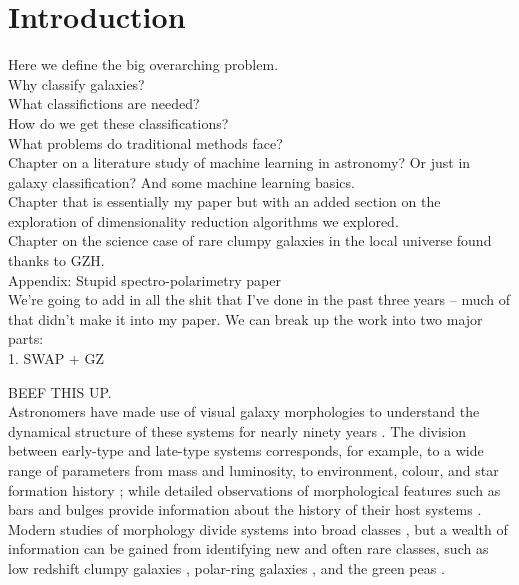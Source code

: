 
\chapter{Introduction}
\label{chap:intro}

Here we define the big overarching problem. \\
Why classify galaxies? \\
What classifictions are needed?\\
How do we get these classifications?\\
What problems do traditional methods face?\\

Chapter on a literature study of machine learning in astronomy? Or just in galaxy classification? And some machine learning basics. \\
Chapter that is essentially my paper but with an added section on the exploration of dimensionality reduction algorithms we explored. \\
Chapter on the science case of rare clumpy galaxies in the local universe found thanks to GZH.\\
Appendix: Stupid spectro-polarimetry paper\\


We're going to add in all the shit that I've done in the past three years -- much of that didn't make it into my paper. 
We can break up the work into two major parts: \\
1. SWAP + GZ 


BEEF THIS UP.\\
Astronomers have made use of visual galaxy morphologies to understand the dynamical structure of these systems for nearly ninety years 
\citep[e.g.,][]{Hubble1936, 
			deVauc1959, 
			Sandage1961, 
			vandenBergh1976, 
			NairAbraham2010, 
			Baillard2011}. 
The division between early-type and late-type systems corresponds, for example, to a wide range of parameters from mass and luminosity, to environment, colour, and star formation history 
\citep[e.g.,][]{Kormendy1977,  
			Dressler1980, 
			Strateva2001, 
			Blanton2003, 
			Kauffman2003, 
			Nakamura2003, 
			Shen2003, 
			Peng2010}; 
while detailed observations of morphological features such as bars and bulges 
provide information about the history of their host systems 
\citep[e.g., review by][]{KK04, 
			Elmegreen2008, 
			Sheth2008, 
			Masters2010, 
			Simmons2014}. 
Modern studies of morphology  divide systems into broad classes 
\citep[e.g.,][]{Conselice2006, 
			Lintott2008, 
			Kartaltepe2015, 
			Peth2016}, 
but a wealth of information can be gained from identifying new and often rare classes, 
such as low redshift clumpy galaxies \citep[e.g.,][]{Elmegreen2013}, polar-ring galaxies \citep[e.g.,][]{Whitmore1990}, and the green peas \citep{Cardamone2009}. 


